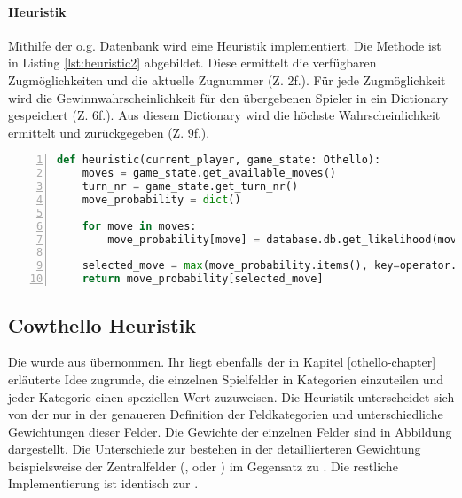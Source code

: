 \paragraph{Heuristik}
\label{heuristik1}
Mithilfe der o.g. Datenbank wird eine Heuristik implementiert. Die Methode  ist in Listing \ref{lst:heuristic2} abgebildet. Diese ermittelt die verfügbaren Zugmöglichkeiten und die aktuelle Zugnummer (Z. 2f.). Für jede Zugmöglichkeit wird die Gewinnwahrscheinlichkeit für den übergebenen Spieler in ein Dictionary gespeichert (Z. 6f.). Aus diesem Dictionary wird die höchste Wahrscheinlichkeit ermittelt und zurückgegeben (Z. 9f.).
\begin{lstlisting}[caption = {Stored Monte-Carlo-Heuristik Funktion}, language = python, captionpos = t , numbers=left, label={lst:heuristic2}]
def heuristic(current_player, game_state: Othello):
	moves = game_state.get_available_moves()
	turn_nr = game_state.get_turn_nr()
	move_probability = dict()

	for move in moves:
		move_probability[move] = database.db.get_likelihood(move, turn_nr, current_player)

	selected_move = max(move_probability.items(), key=operator.itemgetter(1))[0]
 	return move_probability[selected_move]
\end{lstlisting}

\subsection{Cowthello Heuristik}
Die  wurde aus \cite{cow1} übernommen. Ihr liegt ebenfalls der in Kapitel \ref{othello-chapter} erläuterte Idee zugrunde, die einzelnen Spielfelder in Kategorien einzuteilen und jeder Kategorie einen speziellen Wert zuzuweisen. Die Heuristik unterscheidet sich von der  nur in der genaueren Definition der Feldkategorien und unterschiedliche Gewichtungen dieser Felder.
Die Gewichte der einzelnen Felder sind in Abbildung dargestellt. Die Unterschiede zur  bestehen in der detaillierteren Gewichtung beispielsweise der Zentralfelder (,  oder ) im Gegensatz zu . Die restliche Implementierung ist identisch zur .
\\

